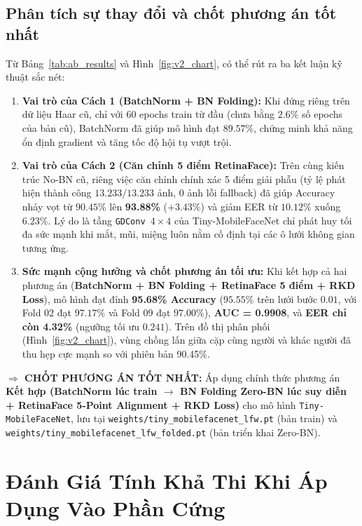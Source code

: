 \documentclass[11pt,a4paper]{article}
\begin{document}
\subsection{Phân tích sự thay đổi và chốt phương án tốt nhất}
Từ Bảng~\ref{tab:ab_results} và Hình~\ref{fig:v2_chart}, có thể rút ra ba kết luận kỹ thuật sắc nét:
\begin{enumerate}
    \item \textbf{Vai trò của Cách 1 (BatchNorm + BN Folding):} Khi đứng riêng trên dữ liệu Haar cũ, chỉ với 60 epochs train từ đầu (chưa bằng $2.6\%$ số epochs của bản cũ), BatchNorm đã giúp mô hình đạt $89.57\%$, chứng minh khả năng ổn định gradient và tăng tốc độ hội tụ vượt trội.
    \item \textbf{Vai trò của Cách 2 (Căn chỉnh 5 điểm RetinaFace):} Trên cùng kiến trúc No-BN cũ, riêng việc căn chỉnh chính xác 5 điểm giải phẫu (tỷ lệ phát hiện thành công $13.233/13.233$ ảnh, 0 ảnh lỗi fallback) đã giúp Accuracy nhảy vọt từ $90.45\%$ lên \textbf{93.88\%} ($+3.43\%$) và giảm EER từ $10.12\%$ xuống $6.23\%$. Lý do là tầng \texttt{GDConv $4 \times 4$} của Tiny-MobileFaceNet chỉ phát huy tối đa sức mạnh khi mắt, mũi, miệng luôn nằm cố định tại các ô lưới không gian tương ứng.
    \item \textbf{Sức mạnh cộng hưởng và chốt phương án tối ưu:} Khi kết hợp cả hai phương án (\textbf{BatchNorm + BN Folding + RetinaFace 5 điểm + RKD Loss}), mô hình đạt đỉnh \textbf{95.68\% Accuracy} ($95.55\%$ trên lưới bước $0.01$, với Fold 02 đạt $97.17\%$ và Fold 09 đạt $97.00\%$), \textbf{AUC = 0.9908}, và \textbf{EER chỉ còn 4.32\%} (ngưỡng tối ưu $0.241$). Trên đồ thị phân phối (Hình~\ref{fig:v2_chart}), vùng chồng lấn giữa cặp cùng người và khác người đã thu hẹp cực mạnh so với phiên bản 90.45\%.
\end{enumerate}

\textbf{$\Rightarrow$ CHỐT PHƯƠNG ÁN TỐT NHẤT:} Áp dụng chính thức phương án \textbf{Kết hợp (BatchNorm lúc train $\to$ BN Folding Zero-BN lúc suy diễn + RetinaFace 5-Point Alignment + RKD Loss)} cho mô hình \texttt{Tiny-MobileFaceNet}, lưu tại \texttt{weights/tiny\_mobilefacenet\_lfw.pt} (bản train) và \texttt{weights/tiny\_mobilefacenet\_lfw\_folded.pt} (bản triển khai Zero-BN).

\section{Đánh Giá Tính Khả Thi Khi Áp Dụng Vào Phần Cứng}
\end{document}
